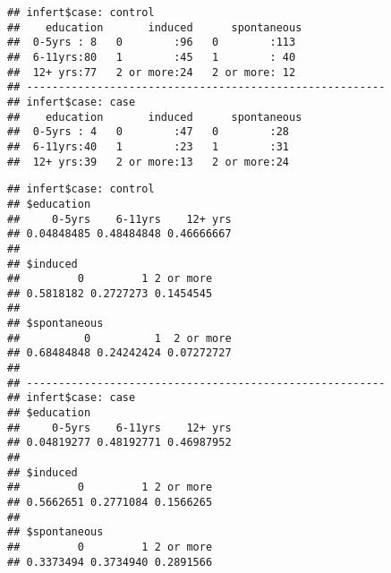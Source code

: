 \documentclass[]{book}
\newenvironment{Shaded}{\begin{snugshade}}{\end{snugshade}}
\newcommand{\KeywordTok}[1]{\textcolor[rgb]{0.13,0.29,0.53}{\textbf{{#1}}}}
\newcommand{\DecValTok}[1]{\textcolor[rgb]{0.00,0.00,0.81}{{#1}}}
\newcommand{\StringTok}[1]{\textcolor[rgb]{0.31,0.60,0.02}{{#1}}}
\newcommand{\NormalTok}[1]{{#1}}
\theoremstyle{definition}
\theoremstyle{definition}
\theoremstyle{remark}
\begin{document}
\begin{verbatim}
## infert$case: control
##    education       induced      spontaneous 
##  0-5yrs : 8   0        :96   0        :113  
##  6-11yrs:80   1        :45   1        : 40  
##  12+ yrs:77   2 or more:24   2 or more: 12  
## -------------------------------------------------------- 
## infert$case: case
##    education       induced      spontaneous
##  0-5yrs : 4   0        :47   0        :28  
##  6-11yrs:40   1        :23   1        :31  
##  12+ yrs:39   2 or more:13   2 or more:24
\end{verbatim}

\begin{Shaded}
\end{Shaded}

\begin{verbatim}
## infert$case: control
## $education
##     0-5yrs    6-11yrs    12+ yrs 
## 0.04848485 0.48484848 0.46666667 
## 
## $induced
##         0         1 2 or more 
## 0.5818182 0.2727273 0.1454545 
## 
## $spontaneous
##          0          1  2 or more 
## 0.68484848 0.24242424 0.07272727 
## 
## -------------------------------------------------------- 
## infert$case: case
## $education
##     0-5yrs    6-11yrs    12+ yrs 
## 0.04819277 0.48192771 0.46987952 
## 
## $induced
##         0         1 2 or more 
## 0.5662651 0.2771084 0.1566265 
## 
## $spontaneous
##         0         1 2 or more 
## 0.3373494 0.3734940 0.2891566
\end{verbatim}

\begin{Shaded}
\end{Shaded}
\end{document}
